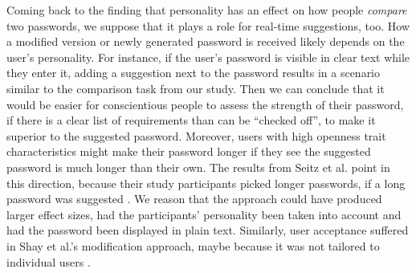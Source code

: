 Coming back to the finding that personality has an effect on how people \textit{compare} two passwords, we suppose that it plays a role for real-time suggestions, too. How a modified version or newly generated password is received likely depends on the user's personality. For instance, if the user's password is visible in clear text while they enter it, adding a suggestion next to the password results in a scenario similar to the comparison task from our study. Then we can conclude that it would be easier for conscientious people to assess the strength of their password, if there is a clear list of requirements than can be ``checked off'', to make it superior to the suggested password. Moreover, users with high openness trait characteristics might make their password longer if they see the suggested password is much longer than their own. The results from Seitz et al. point in this direction, because their study participants picked longer passwords, if a long password was suggested \cite{Seitz2016SuggestionsDecoy}. We reason that the approach could have produced larger effect sizes, had the participants' personality been taken into account and had the password been displayed in plain text. Similarly, user acceptance suffered in Shay et al.'s modification approach, maybe because it was not tailored to individual users \cite{Shay2015SpoonfulOfSugar}.




